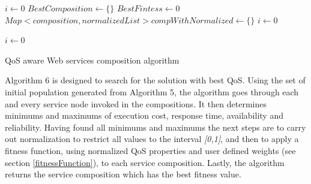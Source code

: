 \begin{algorithm}[h]

 \LinesNumbered
 \SetNlSty{}{}{:}
  $i \leftarrow 0$\;
 $BestComposition \leftarrow \{\}$\;
 $BestFintess \leftarrow 0$\; 
 $Map<composition, normalizedList> compWithNormalized \leftarrow \{\}$\;
  $i \leftarrow 0$\;

  $i \leftarrow 0$\;
 \caption{\footnotesize QoS aware Web services composition algorithm}
\label{generation}
\end{algorithm}
\setlength{\textfloatsep}{20pt}%

Algorithm 6 is designed to search for the solution with best QoS. Using the set of initial population generated from Algorithm 5, the algorithm goes through each and every service node invoked in the compositions. It then determines minimums and maximums of execution cost, response time, availability and reliability. Having found all minimums and maximums the next steps are to carry out normalization to restrict all values to the interval \emph{[0,1]}, and then to apply a fitness function, using normalized QoS properties and user defined weights (see section \ref{fitnessFunction}), to each service composition. Lastly, the algorithm returns the service composition which has the best fitness value. \par

